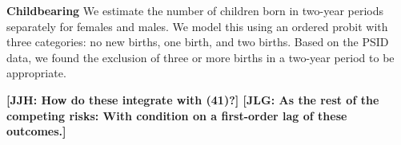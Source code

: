 \noindent \textbf{Childbearing}
\noindent We estimate the number of children born in two-year periods separately for females and males. We model this using an ordered probit with
three categories: no new births, one birth, and two births. Based on the PSID data, we found the exclusion of three or more
births in a two-year period to be appropriate.

\noindent \textbf{[JJH: How do these integrate with (41)?] [JLG: As the rest of the competing risks: With condition on a first-order lag of these outcomes.]}

%
%
%

